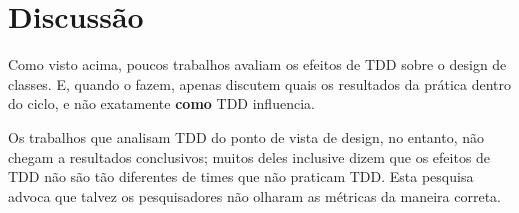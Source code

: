 







\section{Discussão}

Como visto acima, poucos trabalhos avaliam os efeitos de TDD sobre o design de
classes. E, quando o fazem, apenas discutem quais os resultados da prática
dentro do ciclo, e não exatamente \textbf{como} TDD influencia. 

Os trabalhos que analisam TDD do ponto de vista de design, no entanto, não
chegam a resultados conclusivos; muitos deles inclusive dizem que os efeitos
de TDD não são tão diferentes de times que não praticam TDD. Esta pesquisa
advoca que talvez os pesquisadores não olharam as métricas da maneira correta.

